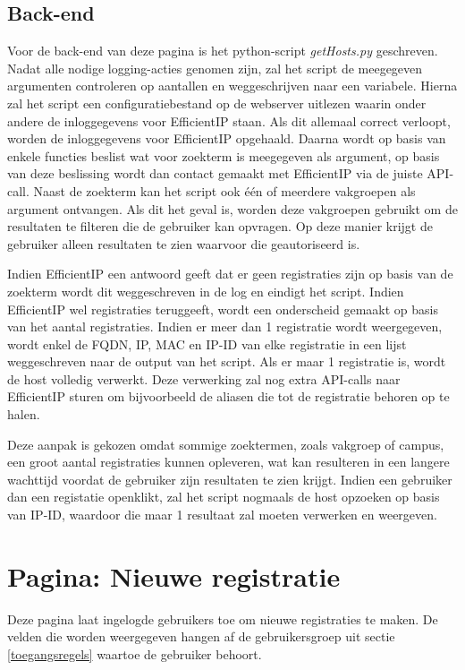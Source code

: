 \subsection{Back-end}
Voor de back-end van deze pagina is het python-script \textit{getHosts.py} geschreven. Nadat alle nodige logging-acties genomen zijn, zal het script de meegegeven argumenten controleren  op aantallen en weggeschrijven naar een variabele. Hierna zal het script een configuratiebestand op de webserver uitlezen waarin onder andere de inloggegevens voor EfficientIP staan. Als dit allemaal correct verloopt, worden de inloggegevens voor EfficientIP opgehaald. Daarna wordt op basis van enkele functies beslist wat voor zoekterm is meegegeven als argument, op basis van deze beslissing wordt dan contact gemaakt met EfficientIP via de juiste API-call. Naast de zoekterm kan het script ook één of meerdere vakgroepen als argument ontvangen. Als dit het geval is, worden deze vakgroepen gebruikt om de resultaten te filteren die de gebruiker kan opvragen. Op deze manier krijgt de gebruiker alleen resultaten te zien waarvoor die geautoriseerd is.

Indien EfficientIP een antwoord geeft dat er geen registraties zijn op basis van de zoekterm wordt dit weggeschreven in de log en eindigt het script. Indien EfficientIP wel registraties teruggeeft, wordt een onderscheid gemaakt op basis van het aantal registraties.
Indien er meer dan 1 registratie wordt weergegeven, wordt enkel de FQDN, IP, MAC en IP-ID van elke registratie in een lijst weggeschreven naar de output van het script. Als er maar 1 registratie is, wordt de host volledig verwerkt. Deze verwerking zal nog extra API-calls naar EfficientIP sturen om bijvoorbeeld de aliasen die tot de registratie behoren op te halen.

Deze aanpak is gekozen omdat sommige zoektermen, zoals vakgroep of campus, een groot aantal registraties kunnen opleveren, wat kan resulteren in een langere wachttijd voordat de gebruiker zijn resultaten te zien krijgt. Indien een gebruiker dan een registatie openklikt, zal het script nogmaals de host opzoeken op basis van IP-ID, waardoor die maar 1 resultaat zal moeten verwerken en weergeven.

\section{Pagina: Nieuwe registratie}
\label{nieuwe-registratie}
Deze pagina laat ingelogde gebruikers toe om nieuwe registraties te maken. De velden die worden weergegeven hangen af de gebruikersgroep uit sectie \ref{toegangsregels} waartoe de gebruiker behoort.

